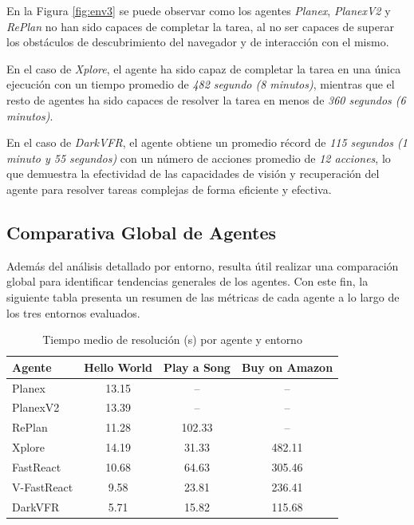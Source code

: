 En la Figura \ref{fig:env3} se puede observar como los agentes \emph{Planex}, \emph{PlanexV2}
y \emph{RePlan} no han sido capaces de completar la tarea, al no ser capaces de superar
los obstáculos de descubrimiento del navegador y de interacción con el mismo.

En el caso de \emph{Xplore}, el agente ha sido capaz de completar la tarea en una única
ejecución con un tiempo promedio de \emph{482 segundo (8 minutos)}, mientras que el resto 
de agentes ha sido capaces de resolver la tarea en menos de \emph{360 segundos (6 minutos)}.

En el caso de \emph{DarkVFR}, el agente obtiene un promedio récord de 
\emph{115 segundos (1 minuto y 55 segundos)} con un número de acciones 
promedio de \emph{12 acciones}, lo que demuestra
la efectividad de las capacidades de visión y recuperación del agente para resolver
tareas complejas de forma eficiente y efectiva.

\subsection{Comparativa Global de Agentes}

Además del análisis detallado por entorno, resulta útil realizar una comparación
global para identificar tendencias generales de los agentes. Con este fin, 
la siguiente tabla presenta un resumen de las métricas de 
cada agente a lo largo de los tres entornos evaluados.

\begin{table}[!h]
\centering
\caption{Tiempo medio de resolución (s) por agente y entorno}
\label{tab:avg-times}
\begin{tabular}{p{3cm} c c c}
\toprule
\textbf{Agente} & \textbf{Hello World} & \textbf{Play a Song} & \textbf{Buy on Amazon} \\
\midrule
Planex           & 13.15     & --     & --     \\
PlanexV2         & 13.39     & --     & --     \\
RePlan           & 11.28     & 102.33 & --     \\
Xplore           & 14.19     & 31.33  & 482.11 \\
FastReact        & 10.68     & 64.63  & 305.46 \\
V-FastReact      & 9.58      & 23.81  & 236.41 \\
DarkVFR          & 5.71      & 15.82  & 115.68 \\
\bottomrule
\end{tabular}
\end{table}

